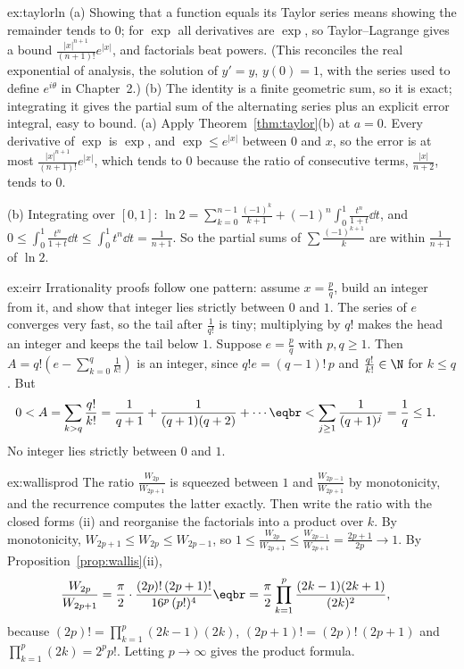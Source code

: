 \begin{solution}{ex:taylorln}
\idea (a) Showing that a function equals its Taylor series means showing the remainder tends to $0$; for $\exp$ all derivatives are $\exp$, so Taylor--Lagrange gives a bound $\frac{|x|^{n+1}}{(n+1)!}e^{|x|}$, and factorials beat powers. (This reconciles the real exponential of analysis, the solution of $y'=y$, $y(0)=1$, with the series used to define $e^{i\theta}$ in Chapter~2.) (b) The identity is a finite geometric sum, so it is exact; integrating it gives the partial sum of the alternating series plus an explicit error integral, easy to bound.
\writeup (a) Apply Theorem~\ref{thm:taylor}(b) at $a=0$. Every derivative of $\exp$ is $\exp$, and $\exp\le e^{|x|}$ between $0$ and $x$, so the error is at most $\frac{|x|^{n+1}}{(n+1)!}e^{|x|}$, which tends to $0$ because the ratio of consecutive terms, $\frac{|x|}{n+2}$, tends to $0$.

(b) Integrating over $[0,1]$: $\ln2=\sum_{k=0}^{n-1}\frac{(-1)^k}{k+1}+(-1)^n\int_0^1\frac{t^n}{1+t}\dd t$, and
$0\le\int_0^1\frac{t^n}{1+t}\dd t\le\int_0^1t^n\dd t=\frac1{n+1}$. So the partial sums of $\sum\frac{(-1)^{k+1}}k$ are within $\frac1{n+1}$ of $\ln2$.
\end{solution}

\begin{solution}{ex:eirr}
\idea Irrationality proofs follow one pattern: assume $x=\frac pq$, build an integer from it, and show that integer lies strictly between $0$ and $1$. The series of $e$ converges very fast, so the tail after $\frac1{q!}$ is tiny; multiplying by $q!$ makes the head an integer and keeps the tail below $1$.
\writeup Suppose $e=\frac pq$ with $p,q\ge1$. Then $A=q!\left(e-\sum_{k=0}^q\frac1{k!}\right)$ is an integer, since $q!e=(q-1)!\,p$ and $\frac{q!}{k!}\in\N$ for $k\le q$. But
\[
\begin{aligned}0<A&=\sum_{k>q}\frac{q!}{k!}=\frac1{q+1}+\frac1{(q+1)(q+2)}+\cdots\eqbr<\sum_{j\ge1}\frac1{(q+1)^j}=\frac1q\le1.\end{aligned}
\]
No integer lies strictly between $0$ and $1$.
\end{solution}

\begin{solution}{ex:wallisprod}
\idea The ratio $\frac{W_{2p}}{W_{2p+1}}$ is squeezed between $1$ and $\frac{W_{2p-1}}{W_{2p+1}}$ by monotonicity, and the recurrence computes the latter exactly. Then write the ratio with the closed forms (ii) and reorganise the factorials into a product over $k$.
\writeup By monotonicity, $W_{2p+1}\le W_{2p}\le W_{2p-1}$, so $1\le\frac{W_{2p}}{W_{2p+1}}\le\frac{W_{2p-1}}{W_{2p+1}}=\frac{2p+1}{2p}\to1$. By Proposition~\ref{prop:wallis}(ii),
\[
\begin{aligned}\frac{W_{2p}}{W_{2p+1}}&=\frac\pi2\cdot\frac{(2p)!\,(2p+1)!}{16^p\,(p!)^4}\eqbr=\frac\pi2\prod_{k=1}^p\frac{(2k-1)(2k+1)}{(2k)^2},\end{aligned}
\]
because $(2p)!=\prod_{k=1}^p(2k-1)(2k)$, $(2p+1)!=(2p)!\,(2p+1)$ and $\prod_{k=1}^p(2k)=2^pp!$. Letting $p\to\infty$ gives the product formula.
\end{solution}

